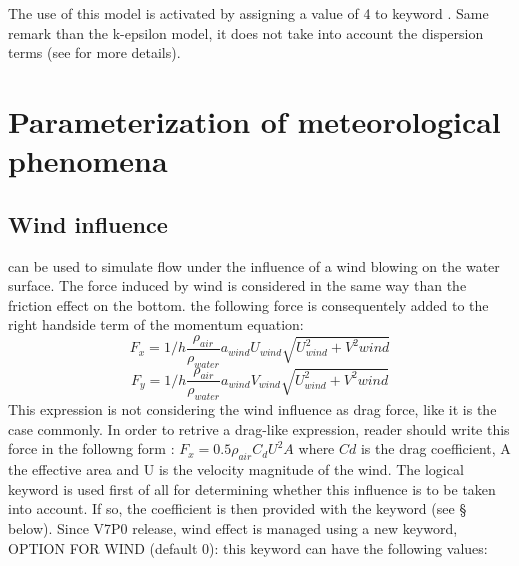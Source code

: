  The use of this model is activated by assigning a value of 4 to keyword . Same remark than the k-epsilon model, it does not take into account the dispersion terms (see \cite{Smagorinsky1963} for more details).


\section{ Parameterization of meteorological phenomena}
\label{sec:param:met:phen}

\subsection{ Wind influence}

  can be used to simulate flow under the influence of a wind blowing on the water surface. The force induced by wind is considered in the same way than the friction effect on the bottom. the following force is consequentely added to the right handside term of the momentum equation:
\begin{equation}
F_x=1/h \frac{\rho_{air}}{\rho_{water}}a_{wind}U_{wind}\sqrt{U^2_{wind}+V^2{wind}} 
\end{equation}
\begin{equation}
F_y=1/h \frac{\rho_{air}}{\rho_{water}}a_{wind}V_{wind}\sqrt{U^2_{wind}+V^2{wind}} 
\end{equation}
This expression is not considering the wind influence as drag force, like it is the case commonly. In order to retrive a drag-like expression, reader should write this force in the followng form : $F_x=0.5\rho_{air}C_d U^2 A$ where $Cd$ is the drag coefficient, A the effective area and U is the velocity magnitude of the wind.
The logical keyword   is used first of all for determining whether this influence is to be taken into account. If so, the coefficient is then provided with the keyword  (see {\S} below). Since V7P0 release, wind effect is managed using a new keyword, OPTION FOR WIND (default 0): this keyword can have the following values:


